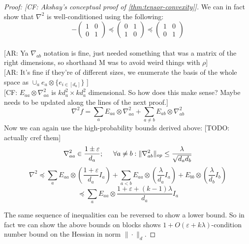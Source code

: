 \documentclass{article}
\newcommand\eps{\varepsilon}
\newcommand\tr{\operatorname{Tr}}
\newcommand{\CF}[1]{{\color{purple}[CF: #1]}}
\newcommand{\AR}[1]{{\color{orange}[AR: #1]}}
\newcommand{\TODO}[1]{{\color{blue}[TODO: #1]}}
\begin{document}
\begin{proof}[Proof: \CF{Akshay's conceptual proof of \cref{thm:tensor-convexity}}]
We can in fact show that $\nabla^{2}$ is well-conditioned using the following:
\[ -\begin{pmatrix} 1 & 0 \\ 0 & 1 \end{pmatrix}
\preceq \begin{pmatrix} 0 & 1 \\ 1 & 0 \end{pmatrix}
\preceq \begin{pmatrix} 1 & 0 \\ 0 & 1 \end{pmatrix}
\]
\\ \AR{Ya $\nabla_{ab}$ notation is fine, just needed something that was a matrix of the right dimensions, so shorthand M was to avoid weird things with $\rho$}
\\ \AR{It's fine if they're of different sizes, we enumerate the basis of the whole space as $\cup_{a} e_{a} \otimes \{e_{i \in [d_{a}]}\}$ }\\
\CF{$E_{aa} \otimes \nabla^2_{aa}$ is $k d_a^2 \times k d_a^2$ dimensional. So how does this make sense? Maybe needs to be updated along the lines of the next proof.}
\[ \nabla^{2} f = \sum_{a} E_{aa} \otimes \nabla^{2}_{aa} + \sum_{a \neq b} E_{ab} \otimes \nabla^{2}_{ab}  \]
Now we can again use the high-probability bounds derived above: \TODO{actually cref them}
\begin{align}\nabla^{2}_{aa} \in \frac{1 \pm \eps}{d_{a}}; \hspace{5mm} \forall a \neq b: \|\nabla^{2}_{ab}\|_{op} \leq \frac{\lambda}{\sqrt{d_{a} d_{b}}} \label{eq:expansion-thing}  \end{align}
\[ \nabla^{2} \preceq \sum_{a} E_{aa} \otimes \left( \frac{1+\eps}{d_{a}} I_{a} \right) + \sum_{a < b} E_{aa} \otimes \left( \frac{\lambda}{d_{a}} I_{a} \right) + E_{bb} \otimes \left( \frac{\lambda}{d_{b}} I_{b} \right)    \]
\[ \preceq \sum_{a} E_{aa} \otimes \frac{1+\eps+(k-1)\lambda}{d_{a}} I_{a}  \]

The same sequence of inequalities can be reversed to show a lower bound. So in fact we can show the above bounds on blocks shows $1+O(\eps + k \lambda)$-condition number bound on the Hessian in norm $\|\cdot\|_{d}$. 
\end{proof}









\end{document}
